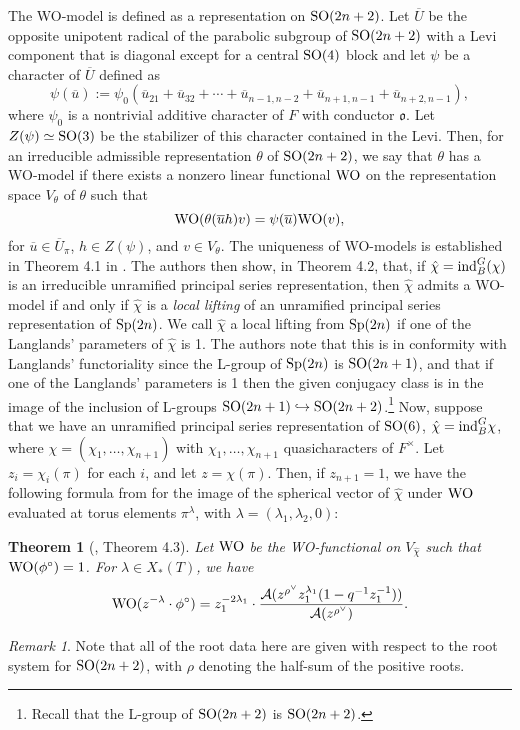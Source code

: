 \documentclass[11pt,letterpaper]{article}
\newcommand{\A}{\mathcal{A}}
\newcommand{\goth}{\mathfrak}
\newcommand{\into}{\hookrightarrow}
\newcommand{\SO}{\textup{SO}}
\newcommand{\Sp}{\textup{Sp}}
\newcommand{\WO}{\textup{WO}}
\newcommand{\ind}{\textup{ind}}
\newtheorem{Theorem}{Theorem}[section]
\theoremstyle{remark}
\newtheorem*{remark}{Remark}
\numberwithin{equation}{section}
\begin{document}
The WO-model is defined as a representation on $\SO(2n+2)$. Let $\overline{U}$ be the opposite unipotent radical of the parabolic subgroup of $\SO(2n+2)$ with a Levi component that is diagonal except for a central $\SO(4)$ block and let $\psi$ be a character of $\overline{U}$ defined as $$\psi(\overline{u}) := \psi_0(\overline{u}_{21} + \overline{u}_{32} + \cdots + \overline{u}_{n-1,n-2} + \overline{u}_{n+1,n-1} + \overline{u}_{n+2,n-1}),$$ where $\psi_0$ is a nontrivial additive character of $F$ with conductor $\goth{o}$. Let $Z(\psi) \simeq \SO(3)$ be the stabilizer of this character contained in the Levi. Then, for an irreducible admissible representation $\theta$ of $\SO(2n+2)$, we say that $\theta$ has a WO-model if there exists a nonzero linear functional $\WO$ on the representation space $V_{\theta}$ of $\theta$ such that $$\WO(\theta(\overline{u}h)v) = \psi(\overline{u})\WO(v),$$ for $\overline{u} \in \overline{U}_{\pi}$, $h \in Z(\psi)$, and $v \in V_{\theta}$. The uniqueness of WO-models is established in Theorem 4.1 in \cite{BFG}. The authors then show, in Theorem 4.2, that, if $\hat{\chi} = \ind_B^G(\chi)$ is an irreducible unramified principal series representation, then $\hat{\chi}$ admits a WO-model if and only if $\hat{\chi}$ is a \emph{local lifting} of an unramified principal series representation of $\Sp(2n)$. We call $\hat{\chi}$ a local lifting from $\Sp(2n)$ if one of the Langlands' parameters of $\hat{\chi}$ is 1. The authors note that this is in conformity with Langlands' functoriality since the L-group of $\Sp(2n)$ is $\SO(2n+1)$, and that if one of the Langlands' parameters is 1 then the given conjugacy class is in the image of the inclusion of L-groups $\SO(2n+1) \into \SO(2n+2)$.\footnote{Recall that the L-group of $\SO(2n+2)$ is $\SO(2n+2)$.}
Now, suppose that we have an unramified principal series representation of $\SO(6)$, $\hat{\chi} = \ind_B^G \chi$, where $\chi = (\chi_1,\hdots,\chi_{n+1})$ with $\chi_1,\hdots,\chi_{n+1}$ quasicharacters of $F^{\times}$. Let $z_i = \chi_i(\pi)$ for each $i$, and let $z = \chi(\pi)$. Then, if $z_{n+1} = 1$, we have the following formula from \cite{BFG} for the image of the spherical vector of $\hat{\chi}$ under $\WO$ evaluated at torus elements $\pi^{\lambda}$, with $\lambda = (\lambda_1,\lambda_2,0)$: 

\begin{Theorem}[\cite{BFG}, Theorem 4.3]\label{thm:BFG}
Let $\WO$ be the WO-functional on $V_{\hat{\chi}}$ such that  $\WO(\phi^{\circ}) = 1$. For $\lambda \in X_{\ast}(T)$, we have $$\WO(z^{-\lambda}\cdot \phi^{\circ}) = z_1^{-2\lambda_1}\cdot \frac{\A(z^{\rho^{\vee}} z_1^{\lambda_1}(1-q^{-1}z_1^{-1}))}{\A(z^{\rho^{\vee}})}.$$
\end{Theorem}
\begin{remark}
Note that all of the root data here are given with respect to the root system for $\SO(2n+2)$, with $\rho$ denoting the half-sum of the positive roots.
\end{remark}
\end{document}
